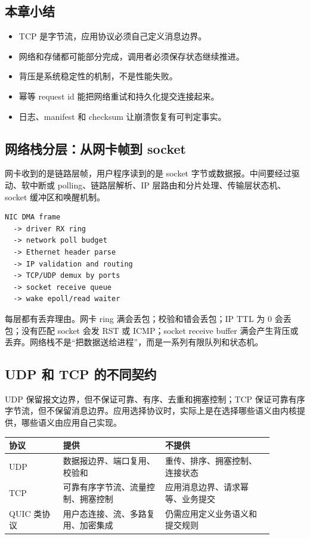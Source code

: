 \subsection{本章小结}

\begin{itemize}
\tightlist
\item TCP 是字节流，应用协议必须自己定义消息边界。
\item 网络和存储都可能部分完成，调用者必须保存状态继续推进。
\item 背压是系统稳定性的机制，不是性能失败。
\item 幂等 request id 能把网络重试和持久化提交连接起来。
\item 日志、manifest 和 checksum 让崩溃恢复有可判定事实。
\end{itemize}

\subsection{网络栈分层：从网卡帧到 socket}

网卡收到的是链路层帧，用户程序读到的是 socket 字节或数据报。中间要经过驱动、软中断或 polling、链路层解析、IP 层路由和分片处理、传输层状态机、socket 缓冲区和唤醒机制。

\begin{lstlisting}
NIC DMA frame
  -> driver RX ring
  -> network poll budget
  -> Ethernet header parse
  -> IP validation and routing
  -> TCP/UDP demux by ports
  -> socket receive queue
  -> wake epoll/read waiter
\end{lstlisting}

每层都有丢弃理由。网卡 ring 满会丢包；校验和错会丢包；IP TTL 为 0 会丢包；没有匹配 socket 会发 RST 或 ICMP；socket receive buffer 满会产生背压或丢弃。网络栈不是“把数据送给进程”，而是一系列有限队列和状态机。

\subsection{UDP 和 TCP 的不同契约}

UDP 保留报文边界，但不保证可靠、有序、去重和拥塞控制；TCP 保证可靠有序字节流，但不保留消息边界。应用选择协议时，实际上是在选择哪些语义由内核提供，哪些语义由应用自己实现。

\begin{longtable}{|p{0.18\linewidth}|p{0.34\linewidth}|p{0.36\linewidth}|}
\toprule
协议 & 提供 & 不提供 \\
\midrule
UDP & 数据报边界、端口复用、校验和 & 重传、排序、拥塞控制、连接状态 \\\tablerowrule
TCP & 可靠有序字节流、流量控制、拥塞控制 & 应用消息边界、请求幂等、业务提交 \\\tablerowrule
QUIC 类协议 & 用户态连接、流、多路复用、加密集成 & 仍需应用定义业务语义和提交规则 \\
\bottomrule
\end{longtable}

